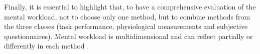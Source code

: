         Finally, it is essential to highlight that, to have a comprehensive evaluation of the mental workload, not to choose only one method, but to combine methods from the three classes (task performance, physiological measurements and subjective questionnaires). Mental workload is multidimensional and can reflect partially or differently in each method \cite{sanders1998human}.